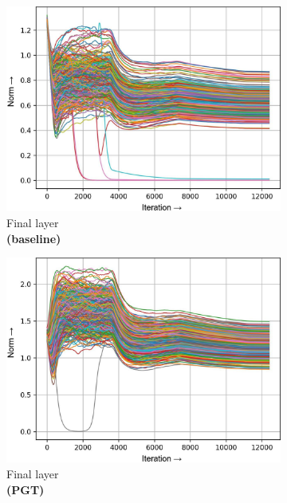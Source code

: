 \documentclass[runningheads]{llncs}
\begin{document}
\begin{figure}[t]
\begin{subfigure}[t]{0.16\textwidth}
\includegraphics[width=\textwidth]{trimmed/baseline-w-layer-7-2}
\caption{Final layer\\ \textbf{(baseline)}
}\end{subfigure}
\begin{subfigure}[t]{0.16\textwidth}
\includegraphics[width=\textwidth]{trimmed/pgt-w-layer-7-2}
\caption{Final layer\\ \textbf{(PGT)}
}\end{subfigure}
\captionsetup{font=scriptsize}
\begin{subfigure}[t]{0.16\textwidth}

\end{subfigure}
\end{figure}
\end{document}
